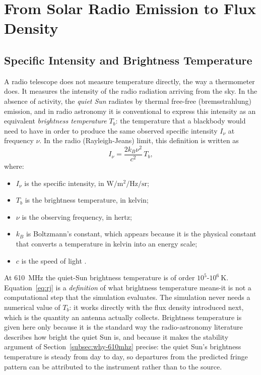 \section{From Solar Radio Emission to Flux Density}
\label{sec:radioastro-quantities}

\subsection{Specific Intensity and Brightness Temperature}
\label{subsec:quiet-sun-brightness}
A radio telescope does not measure temperature directly, the way a
thermometer does. It measures the intensity of the radio radiation arriving
from the sky. In the absence of activity, the \emph{quiet Sun} radiates by
thermal free-free (bremsstrahlung) emission, and in radio astronomy it is
conventional to express this intensity as an equivalent \emph{brightness
temperature} $T_b$: the temperature that a blackbody would need to have in
order to produce the same observed specific intensity $I_\nu$ at frequency
$\nu$. In the radio (Rayleigh-Jeans) limit, this definition is written as
\begin{equation}
  I_\nu = \frac{2 k_B \nu^2}{c^2}\,T_b ,
  \label{eq:rj}
\end{equation}
where:
\begin{itemize}[leftmargin=1.5em,itemsep=1pt,topsep=2pt]
  \item $I_\nu$ is the specific intensity, in $\si{\watt\per\square\metre\per\hertz\per\steradian}$;
  \item $T_b$ is the brightness temperature, in kelvin;
  \item $\nu$ is the observing frequency, in hertz;
  \item $k_B$ is Boltzmann's constant, which appears because it is the
        physical constant that converts a temperature in kelvin into an
        energy scale;
  \item $c$ is the speed of light \citep{dulk1985,kraus1986}.
\end{itemize}
At \SI{610}{\mega\hertz} the quiet-Sun brightness temperature is of order
$10^5$-$10^6~\si{\kelvin}$. Equation~\eqref{eq:rj} is a \emph{definition} of
what brightness temperature means-it is not a computational step that the
simulation evaluates. The simulation never needs a numerical value of $T_b$:
it works directly with the flux density introduced next, which is the
quantity an antenna actually collects. Brightness temperature is given here
only because it is the standard way the radio-astronomy literature describes
how bright the quiet Sun is, and because it makes the stability argument of
Section~\ref{subsec:why-610mhz} precise: the quiet Sun's brightness
temperature is steady from day to day, so departures from the predicted
fringe pattern can be attributed to the instrument rather than to the source.

